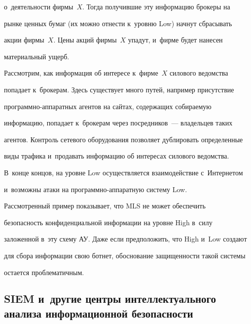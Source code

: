 о~деятельности фирмы~$X$. Тогда получившие эту информацию брокеры на 


рынке ценных бумаг (их можно отнести к~уровню Low) начнут сбрасывать 


акции фирмы~$X$. Цены акций фирмы~$X$ упадут, и~фирме будет нанесен 


материальный ущерб. 


  


  Рассмотрим, как информация об интересе к~фирме~$X$ силового ведомства 


попадает к~брокерам. Здесь существует много путей, например присутствие 


про\-грам\-мно-ап\-па\-рат\-ных агентов на сайтах, содержащих собираемую 


информацию, попадает к~брокерам через посредников~--- владельцев таких 


агентов. Контроль сетевого оборудования позволяет дублировать определенные 


виды трафика и~продавать информацию об интересах силового ведомства. 


В~конце концов, на уровне Low осуществляется взаимодействие с~Интернетом 


и~возможны атаки на про\-граммно-ап\-па\-рат\-ную систему Low.


  


  Рассмотренный пример показывает, что MLS не может обеспечить 


без\-опас\-ность конфиденциальной информации на уровне High в~силу 


заложенной в~эту схему АУ. Даже если предположить, что High и~Low создают 


для сбора информации свою ботнет, обоснование защищенности такой системы 


остается проблематичным.










  


\subsection{SIEM и~другие центры интеллектуального анализа информационной безопасности} 


